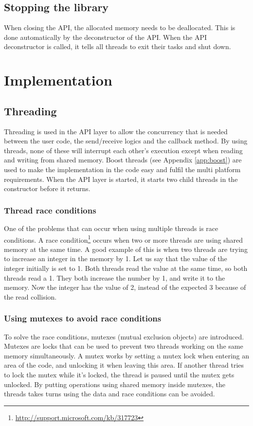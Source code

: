 \subsection{Stopping the library}
When closing the API, the allocated memory needs to be deallocated. This is done automatically by the deconstructor of the API. When the API deconstructor is called, it tells all threads to exit their tasks and shut down.

\section{Implementation}
\subsection{Threading}
\label{threading}
Threading is used in the API layer to allow the concurrency that is needed between the user code, the send/receive logics and the callback method. By using threads, none of these will interrupt each other's execution except when reading and writing from shared memory. Boost threads (see Appendix \ref{app:boost}) are used to make the implementation in the code easy and fulfil the multi platform requirements. When the API layer is started, it starts two child threads in the constructor before it returns.

\subsubsection{Thread race conditions}
\label{thread_race_conditions}
One of the problems that can occur when using multiple threads is race conditions. A race condition\footnote{\url{http://support.microsoft.com/kb/317723}} occurs when two or more threads are using shared memory at the same time. A good example of this is when two threads are trying to increase an integer in the memory by 1. Let us say that the value of the integer initially is set to 1. Both threads read the value at the same time, so both threads read a 1. They both increase the number by 1, and write it to the memory. Now the integer has the value of 2, instead of the expected 3 because of the read collision.

\subsubsection{Using mutexes to avoid race conditions}
\label{mutex}
To solve the race conditions, mutexes (mutual exclusion objects) are introduced. Mutexes are locks that can be used to prevent two threads working on the same memory simultaneously. A mutex works by setting a mutex lock when entering an area of the code, and unlocking it when leaving this area. If another thread tries to lock the mutex while it's locked, the thread is paused until the mutex gets unlocked. By putting operations using shared memory inside mutexes, the threads takes turns using the data and race conditions can be avoided.

